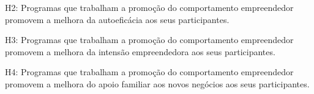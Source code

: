 H2: Programas que trabalham a promoção do comportamento empreendedor promovem a melhora da autoeficácia aos seus participantes.

H3: Programas que trabalham a promoção do comportamento empreendedor promovem a melhora da intensão empreendedora aos seus participantes.

H4: Programas que trabalham a promoção do comportamento empreendedor promovem a melhora do apoio familiar aos novos negócios aos seus participantes.








